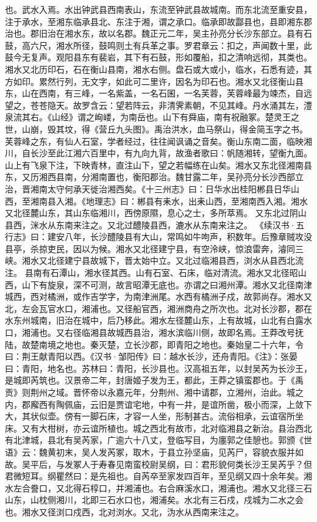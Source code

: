 \documentclass[12pt,UTF8]{ctexbook}
\begin{document}
也。武水入焉。水出钟武县西南表山，东流至钟武县故城南。而东北流至重安县，注于承水，至湘东临承县北、东注于湘，谓之承口。临承即故酃县也，县即湘东郡治也。郡旧治在湘水东，故以名郡。魏正元二年，吴主孙亮分长沙东部立。县有石鼓，高六尺，湘水所径，鼓鸣则土有兵革之事。罗君章云：扣之，声闻数十里，此鼓今无复声。观阳县东有裴岩，其下有石鼓，形如覆船，扣之清响远彻，其类也。湘水又北历印石，石在衡山县南，湘水右侧。盘石或大或小，临水，石悉有迹，其方如印。累然行列，无文字，如此可二里许，因名为印石也。湘水又北径衡山县东，山在西南，有三峰，一名紫盖，一名石囷，一名芙蓉，芙蓉峰最为竦杰，自远望之，苍苍隐天。故罗含云：望若阵云，非清霁素朝，不见其峰。丹水涌其左，澧泉流其右。《山经》谓之峋嵝，为南岳也。山下有舜庙，南有祝融冢。楚灵王之世，山崩，毁其坟，得《营丘九头图》。禹治洪水，血马祭山，得金简玉字之书。芙蓉峰之东，有仙人石室，学者经过，往往闻讽诵之音矣。衡山东南二面，临映湘川，自长沙至此江湘六百里中，有九向九背，故渔者歌曰：帆随湘转，望衡九面。山上有飞泉下注，下映青林，直注山下，望之若幅练在山矣。湘水又东北径湘南县东，又历湘西县南，分湘南置也，衡阳郡治。魏甘露二年，吴孙亮分长沙西部立治，晋湘南太守何承天徙治湘西矣。《十三州志》曰：日华水出桂阳郴县日华山西，至湘南县入湘。《地理志》曰：郴县有耒水，出耒山西，至湘南西入湘。湘水又北径麓山东，其山东临湘川，西傍原隰，息心之士，多所萃焉。
又东北过阴山县西，洣水从东南来注之。又北过醴陵县西，漉水从东南来注之。
《续汉书·五行志》曰：建安八年，长沙醴陵县有大山，常鸣如牛呴声，积数年。后豫章贼攻没县亭，杀掠吏民，因以为候。湘水又北径建宁县，有空泠峡，惊浪雷奔，濬同三峡。湘水又北径建宁县故城下，晋太始中立。又北过临湘县西，浏水从县西北流注。
县南有石潭山，湘水径其西。山有石室、石床，临对清流。湘水又北径昭山西，山下有旋泉，深不可测，故言昭潭无底也。亦谓之曰湘州潭。湘水又北径南津城西，西对橘洲，或作吉学字，为南津洲尾。水西有橘洲子戍，故郭尚存。湘水又北，左会瓦官水口，湘浦也。又径船官西，湘洲商舟之所次也。北对长沙郡，郡在水东州城南，旧治在城中，后乃移此。湘水左径麓山东，上有故城，山北有白露水口，湘浦也。又右径临湘县故城西县治，湘水滨临川侧，故即名焉。王莽改号抚陆，故楚南境之地也。秦灭楚，立长沙郡，即青阳之地也。秦始皇二十六年，令曰：荆王献青阳以西。《汉书·邹阳传》曰：越水长沙，还舟青阳。《注》：张晏曰：青阳，地名也。苏林曰：青阳，长沙县也。汉高祖五年，以封吴芮为长沙王，是城即芮筑也。汉景帝二年，封唐姬子发为王，都此，王莽之镇蛮郡也。于《禹贡》则荆州之域。晋怀帝以永嘉元年，分荆州、湘中请郡，立湘州，治此。城之内，郡廨西有陶佩庙，云旧是贾谊宅地，中有一井，是谊所凿，极小而深，上敛下大，其状似壶。傍有一脚石床，才容一人坐，形制甚古。流俗相承，云谊宿所坐床。又有大柑树，亦云谊所植也。城之西北有故市，北对临湘县之新治。县治西北有北津城，县北有吴芮家，广逾六十八丈，登临写目，为廛郭之佳憩也。郭颁《世语》云：魏黄初末，吴人发芮冢，取木，于县立孙坚庙，见芮尸，容貌衣服并如故。吴平后，与发冢人于寿春见南蛮校尉吴纲，曰：君形貌何类长沙王吴芮乎？但君微短耳。纲瞿然曰：是先祖也。自芮卒至家发四百年，至见纲又四十余年矣。湘水左合誊口，又北得石椁口，并湘浦也。右合麻溪水口，湘浦也。湘水又北径三石山东，山枕侧湘川，北即三石水口也，湘浦矣。水北有三石戍，戍城为二水之会也。湘水又径浏口戍西，北对浏水。又北，沩水从西南来注之。
\end{document}

